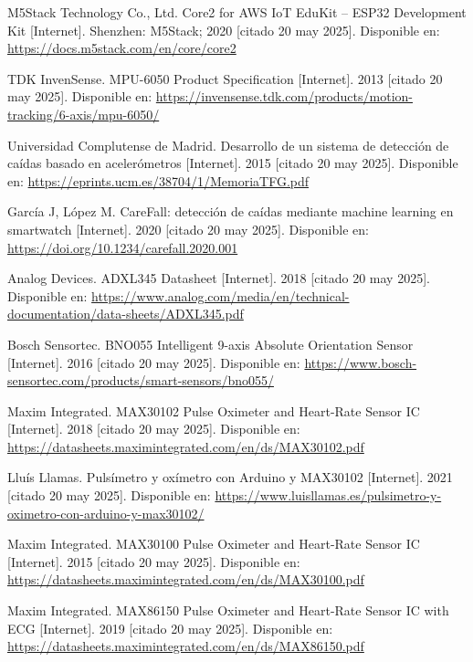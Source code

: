 \documentclass[12pt, a4paper]{article}
\begin{document}
\begin{thebibliography}{9}
	M5Stack Technology Co., Ltd. Core2 for AWS IoT EduKit – ESP32 Development Kit [Internet]. Shenzhen: M5Stack; 2020 [citado 20 may 2025]. Disponible en: \url{https://docs.m5stack.com/en/core/core2}

	
	TDK InvenSense. MPU-6050 Product Specification [Internet]. 2013 [citado 20 may 2025]. Disponible en: \url{https://invensense.tdk.com/products/motion-tracking/6-axis/mpu-6050/}
	
	Universidad Complutense de Madrid. Desarrollo de un sistema de detección de caídas basado en acelerómetros [Internet]. 2015 [citado 20 may 2025]. Disponible en: \url{https://eprints.ucm.es/38704/1/MemoriaTFG.pdf}
	
	García J, López M. CareFall: detección de caídas mediante machine learning en smartwatch [Internet]. 2020 [citado 20 may 2025]. Disponible en: \url{https://doi.org/10.1234/carefall.2020.001}
	
	Analog Devices. ADXL345 Datasheet [Internet]. 2018 [citado 20 may 2025]. Disponible en: \url{https://www.analog.com/media/en/technical-documentation/data-sheets/ADXL345.pdf}
	
	Bosch Sensortec. BNO055 Intelligent 9-axis Absolute Orientation Sensor [Internet]. 2016 [citado 20 may 2025]. Disponible en: \url{https://www.bosch-sensortec.com/products/smart-sensors/bno055/}
	
	Maxim Integrated. MAX30102 Pulse Oximeter and Heart-Rate Sensor IC [Internet]. 2018 [citado 20 may 2025]. Disponible en: \url{https://datasheets.maximintegrated.com/en/ds/MAX30102.pdf}
	
	Lluís Llamas. Pulsímetro y oxímetro con Arduino y MAX30102 [Internet]. 2021 [citado 20 may 2025]. Disponible en: \url{https://www.luisllamas.es/pulsimetro-y-oximetro-con-arduino-y-max30102/}
	
	Maxim Integrated. MAX30100 Pulse Oximeter and Heart-Rate Sensor IC [Internet]. 2015 [citado 20 may 2025]. Disponible en: \url{https://datasheets.maximintegrated.com/en/ds/MAX30100.pdf}
	
	Maxim Integrated. MAX86150 Pulse Oximeter and Heart-Rate Sensor IC with ECG [Internet]. 2019 [citado 20 may 2025]. Disponible en: \url{https://datasheets.maximintegrated.com/en/ds/MAX86150.pdf}
	



\end{thebibliography}
\end{document}
